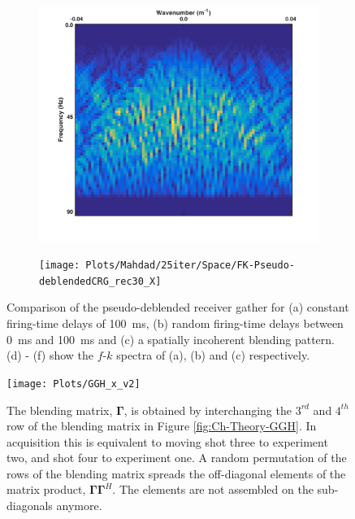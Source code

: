 \begin{figure}
\begin{subfigure}[b]{0.3\textwidth}
	\end{subfigure}
	\centering
	\begin{subfigure}[b]{0.3\textwidth}
		\centering
		\includegraphics[width = \textwidth]{Plots/Mahdad/25iter/TimeDelay/FK-Pseudo-deblendedCRG_rec30}
		\caption{}
		\label{fig:Ch-Theory-PseudoCRG-FK-IncoherentDelay}
	\end{subfigure}
	\centering
	\begin{subfigure}[b]{0.3\textwidth}
		\centering
		\texttt{[image: Plots/Mahdad/25iter/Space/FK-Pseudo-deblendedCRG\_rec30\_X]}
		\caption{}
		\label{fig:Ch-Theory-PseudoCRG-FK-IncoherentSpace}
	\end{subfigure}
	
	\caption{Comparison of the pseudo-deblended receiver gather for (a) constant firing-time delays of \SI{100}{\milli\second}, (b) random firing-time delays between \SI{0}{\milli\second} and \SI{100}{\milli\second} and (c) a spatially incoherent blending pattern. (d) - (f) show the $f$-$k$ spectra of (a), (b) and (c) respectively.}
	\label{fig:Ch-Theory-PseudoCRG-IncoherencyEffect}

\end{figure}

\begin{figure}
	\centering
	\texttt{[image: Plots/GGH\_x\_v2]}
	\caption{The blending matrix, $\mathbf{\Gamma}$, is obtained by interchanging the $3^{rd}$ and $4^{th}$ row of the blending matrix in Figure \ref{fig:Ch-Theory-GGH}. In acquisition this is equivalent to moving shot three to experiment two, and shot four to experiment one. A random permutation of the rows of the blending matrix spreads the off-diagonal elements of the matrix product, $\mathbf{\Gamma\Gamma}^H$. The elements are not assembled on the sub-diagonals anymore.}
	\label{fig:Ch-Theory-GGHx}
\end{figure}

